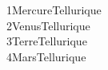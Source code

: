 {\begin{columns}
\begin{column}{7cm}
{{								1\hspace{1em}Mercure\hspace{1em}Tellurique\\
								2\hspace{1em}Venus\hspace{2em}Tellurique\\
								3\hspace{1em}Terre\hspace{2em}Tellurique\\
								4\hspace{1em}Mars\hspace{2.5em}Tellurique
							}
							\promptM{\cursor}
						}
					\end{column}
				\end{columns}
			}
